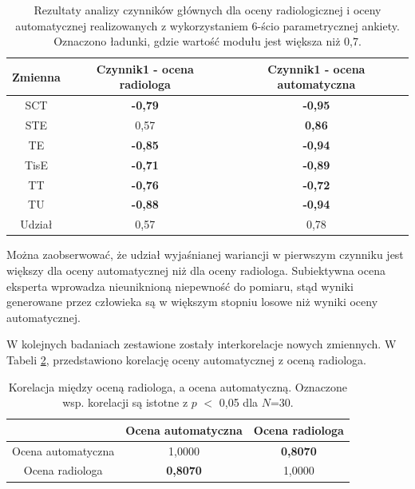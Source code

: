 \begin{table}[h]
	\centering
	\setlength{\tabcolsep}{3pt}
	\setlength\extrarowheight{2pt}
	\caption{Rezultaty analizy czynników głównych dla oceny radiologicznej i oceny automatycznej realizowanych z wykorzystaniem 6-ścio parametrycznej ankiety. Oznaczono ładunki, gdzie wartość modułu jest większa niż 0,7.}
	\label{tab:pca-gt-pred}
	\begin{tabular}{c|c|c}
		Zmienna&Czynnik1 - ocena radiologa&Czynnik1 - ocena automatyczna \\
		\hline \hline
		SCT&\textbf{-0,79}&\textbf{-0,95}\\
		\hline
		STE&0,57&\textbf{0,86}\\
		\hline
		TE&\textbf{-0,85}&\textbf{-0,94}\\
		\hline
		TisE&\textbf{-0,71}&\textbf{-0,89}\\
		\hline
		TT&\textbf{-0,76}&\textbf{-0,72}\\
		\hline
		TU&\textbf{-0,88}&\textbf{-0,94}\\
		\hline \hline	
		Udział&0,57&0,78\\
			
	\end{tabular}
\end{table}

Można zaobserwować, że udział wyjaśnianej wariancji w pierwszym czynniku jest większy dla oceny automatycznej niż dla oceny radiologa. Subiektywna ocena eksperta wprowadza nieuniknioną niepewność do pomiaru, stąd wyniki generowane przez człowieka są w większym stopniu losowe niż wyniki oceny automatycznej. 

W kolejnych badaniach zestawione zostały interkorelacje nowych zmiennych. W Tabeli \ref{tab:gtVSpred}, przedstawiono korelację oceny automatycznej z oceną radiologa.


\begin{table}[h]
	\centering
	\setlength{\tabcolsep}{3pt}
	\setlength\extrarowheight{2pt}
	\caption{Korelacja między oceną radiologa, a ocena automatyczną. Oznaczone wsp. korelacji są istotne z $p$ $<$ 0,05 dla $N$=30.}
	\label{tab:gtVSpred}
	\begin{tabular}{c|c|c}
		&Ocena automatyczna &Ocena radiologa \\
		\hline \hline
		Ocena automatyczna&1,0000&\textbf{0,8070}\\
		\hline
		Ocena radiologa&\textbf{0,8070}&1,0000\\
			
	\end{tabular}
\end{table}

